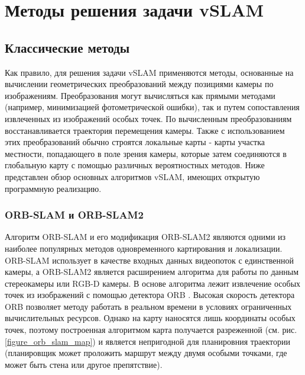 \documentclass{mipt-thesis-ms}
\begin{document}
	
	\chapter{Методы решения задачи vSLAM}
	
	\section{Классические методы}
	
	Как правило, для решения задачи vSLAM применяются методы, основанные на вычислении геометрических преобразований между позициями камеры по изображениям. Преобразования могут вычисляться как прямыми методами (например, минимизацией фотометрической ошибки), так и путем сопоставления извлеченных из изображений особых точек. По вычисленным преобразованиям восстанавливается траектория перемещения камеры. Также с использованием этих преобразований обычно строятся локальные карты - карты участка местности, попадающего в поле зрения камеры, которые затем соединяются в глобальную карту с помощью различных вероятностных методов. Ниже представлен обзор основных алгоритмов vSLAM, имеющих открытую программную реализацию.
	
	\subsection{ORB-SLAM и ORB-SLAM2}
	
	Алгоритм ORB-SLAM \cite{mur2015orb} и его модификация ORB-SLAM2 \cite{mur2017orb} являются одними из наиболее популярных методов одновременного картирования и локализации. ORB-SLAM использует в качестве входных данных видеопоток с единственной камеры, а ORB-SLAM2 является расширением алгоритма для работы по данным стереокамеры или RGB-D камеры. В основе алгоритма лежит извлечение особых точек из изображений с помощью детектора ORB \cite{rublee2011orb}. Высокая скорость детектора ORB позволяет методу работать в реальном времени в условиях ограниченных вычислительных ресурсов. Однако на карту наносятся лишь координаты особых точек, поэтому построенная алгоритмом карта получается разреженной (см. рис. \ref{figure_orb_slam_map}) и является непригодной для планировния траектории (планировщик может проложить маршрут между двумя особыми точками, где может быть стена или другое препятствие).
\end{document}
